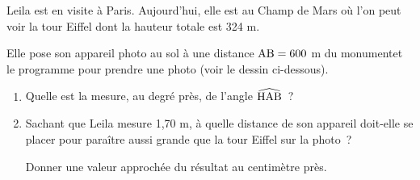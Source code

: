 \documentclass[exercice]{thedocument}%
\begin{document}
%
Leila est en visite à Paris. Aujourd'hui, elle est au Champ de Mars où l'on
peut voir la tour Eiffel dont la hauteur totale  est 324 m.%
\par\medskip\noindent
Elle pose son appareil photo au sol à une distance $\text{AB}=600$ m
du monumentet le programme pour prendre une photo (voir le dessin ci-dessous).
\begin{enumerate}
    \item Quelle est la mesure, au degré près, de l'angle $\widehat{\text{HAB}}$~?
    \item Sachant que Leila mesure 1,70 m, à quelle distance  de son
    appareil doit-elle se placer pour paraître aussi grande que la tour Eiffel sur
    la photo~?\par\noindent
    Donner une valeur approchée du résultat au centimètre près.
\end{enumerate}
{\centering{}\par}
\showthesource
\end{document}
